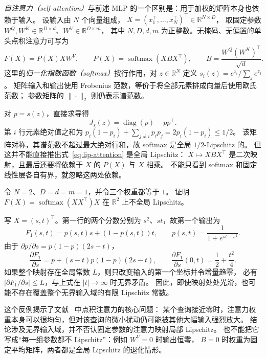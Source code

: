 \documentclass[UTF8,12pt,a4paper,fontset=fandol]{ctexart}
\begin{document}
\emph{自注意力（self-attention）}与前述 MLP 的一个区别是：用于加权的矩阵本身也依赖于输入。
设输入由 $N$ 个向量组成，
$X=(x_1^\top,\ldots,x_N^\top)^\top\in\mathbb R^{N\times D}$，
取固定参数
$W^Q,W^K\in\mathbb R^{D\times d}$、$W^V\in\mathbb R^{D\times m}$，
其中 $N,D,d,m$ 为正整数。无掩码、无偏置的单头点积注意力可写为
\begin{equation}\label{eq:lip-attention}
  F(X)=P(X)XW^V,\qquad
  P(X)=\operatorname{softmax}(XBX^\top),\qquad
  B=\frac{W^Q(W^K)^\top}{\sqrt d}.
\end{equation}
这里的\emph{归一化指数函数（softmax）}按行作用，对 $z\in\mathbb R^N$ 定义
$s_i(z)=e^{z_i}/\sum_j e^{z_j}$。
矩阵输入和输出使用 Frobenius 范数，等价于将全部元素排成向量后使用欧氏范数；
参数矩阵的 $\|\cdot\|_2$ 则仍表示谱范数。

对 $p=s(z)$，直接求导得
\[
  J_s(z)=\operatorname{diag}(p)-pp^\top.
\]
第 $i$ 行元素绝对值之和为
$p_i(1-p_i)+\sum_{j\ne i}p_ip_j=2p_i(1-p_i)\le1/2$。
该矩阵对称，其谱范数不超过最大绝对行和，故 softmax 是全局 $1/2$-Lipschitz 的。
但这并不能直接推出式~\eqref{eq:lip-attention} 是全局 Lipschitz：
$X\mapsto XBX^\top$ 是二次映射，且最后还要将依赖于 $X$ 的 $P(X)$ 与 $X$ 相乘。
不能只看到 softmax 和固定线性层各自有界，就忽略这两处依赖。

\begin{example}\label{ex:lip-attention-counterexample}
令 $N=2$、$D=d=m=1$，并令三个权重都等于 $1$。
证明 $F(X)=\operatorname{softmax}(XX^\top)X$ 在 $\mathbb R^2$ 上不全局 Lipschitz。
\end{example}
\begin{solve}
写 $X=(s,t)^\top$。第一行的两个分数分别为 $s^2$、$st$，故第一个输出为
\[
  F_1(s,t)=p(s,t)s+(1-p(s,t))t,\qquad
  p(s,t)=\frac1{1+e^{st-s^2}}.
\]
由于 $\partial p/\partial s=p(1-p)(2s-t)$，
\[
  \frac{\partial F_1}{\partial s}
  =p+(s-t)p(1-p)(2s-t),\qquad
  \frac{\partial F_1}{\partial s}(0,t)=\frac12+\frac{t^2}{4}.
\]
如果整个映射存在全局常数 $L$，则只改变输入的第一个坐标并令增量趋零，
必有 $|\partial F_1/\partial s|\le L$，与上式在 $|t|\to\infty$ 时无界矛盾。
因此，即使映射处处光滑，也可能不存在覆盖整个无界输入域的有限 Lipschitz 常数。
\end{solve}

这个反例揭示了文献~\cite{kim-attention} 中点积注意力的核心问题：
某个查询接近零时，注意力权重本身可以很均匀，但对该查询的微小扰动仍可能被其他大幅输入强烈放大。
结论涉及无界输入域，并不否认固定参数的注意力映射局部 Lipschitz。
也不能把它写成“每一组参数都不 Lipschitz”：例如 $W^V=0$ 时输出恒零，
$B=0$ 时权重为固定平均矩阵，两者都是全局 Lipschitz 的退化情形。
\end{document}
